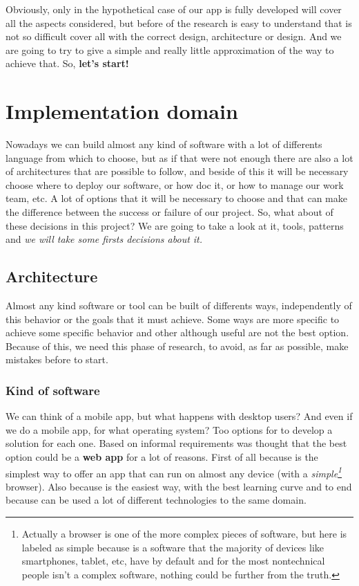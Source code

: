 \noindent Obviously, only in the hypothetical case of our app is fully developed will cover
all the aspects considered, but before of the research is easy to understand that
is not so difficult cover all with the correct design, architecture or design.
\intro
And we are going to try to give a simple and really little approximation of the way
to achieve that.
\intro
So, \textbf{let's start!}


\section{Implementation domain}


Nowadays we can build almost any kind of software with a lot of differents
language from which to choose, but as if that were not enough there
are also a lot of architectures that are possible to follow, and beside
of this it will be necessary choose where to deploy our software, or how
doc it, or how to manage our work team, etc. A lot of options that it
will be necessary to choose and that can make the difference between the
success or failure of our project. So, what about of these decisions
in this project? We are going to take a look at it, tools, patterns and
\textit{we will take some firsts decisions about it.}

\subsection{Architecture}

Almost any kind software or tool can be built of differents ways, independently
of this behavior or the goals that it must achieve. Some ways are more specific
to achieve some specific behavior and other although useful are not the best option.
Because of this, we need this phase of research, to avoid, as far as possible, make mistakes before to start.

\subsubsection{Kind of software}
We can think of a mobile app, but what happens with desktop users? And even if
we do a mobile app, for what operating system? Too options for to develop a solution
for each one. Based on informal requirements was thought that the best option could be a
\textbf{web app} for a lot of reasons. First of all because is the simplest
way to offer an app that can run on almost any device (with a \textit{
simple\footnote{Actually a browser is one of the more complex pieces of
software, but here is labeled as simple because is a software that the
majority of devices like smartphones, tablet, etc, have by default and for
the most nontechnical people isn't a complex software, nothing could be
further from the truth.}} browser). Also because is the easiest way, with the best
learning curve and to end because can be used a lot of different technologies to the same domain.

